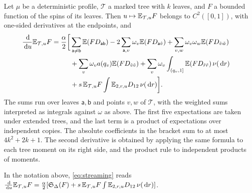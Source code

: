 \begin{lemma}\label{lem:streaming}
Let $\mu$ be a deterministic profile, $\mathcal T$ a marked tree with $k$
leaves, and $F$ a bounded function of the spins of its leaves. Then
$u\mapsto\mathbb E_{\mathcal T,u}F$ belongs to $C^2([0,1])$, with one-sided
derivatives at the endpoints, and
\begin{align}
 \frac{\,\mathrm d}{\,\mathrm d u}\mathbb E_{\mathcal T,u}F=\frac\alpha2\bigg[&
 \sum_{\mathsf a\ne\mathsf b}\mathbb E(FD_{\mathsf{ab}})
 -2\sum_{\mathsf a,v}\omega_v\mathbb E(FD_{\mathsf a\hat v})
 +\sum_{v,w}\omega_v\omega_w\mathbb E(FD_{\hat v\check w})\nonumber\\
 &+\sum_v\omega_va(q_v)\mathbb E(FD_{\hat v\check v})
 +\sum_v\omega_v\int_{(q_v,1]}\mathbb E(FD_{\hat r\check r})\,\nu(\,\mathrm d r)
 \nonumber\\
 &+s\,\mathbb E_{\mathcal T,u}F\int\mathbb E_{2,r,u}D_{12}\,\nu(\,\mathrm d r)\bigg].
 \label{eq:streaming}
\end{align}
The sums run over leaves $\mathsf a,\mathsf b$ and points $v,w$ of
$\mathcal T$, with the weighted sums interpreted as integrals against
$\omega$ as above. The first five expectations are taken under extended
trees, and the last term is a product of expectations over independent
copies. The absolute coefficients in the bracket sum to at most
$4k^2+2k+1$. The second derivative is obtained by applying the same
formula to each tree moment on its right side, and the product rule to
independent products of moments.
\end{lemma}

In the notation above, \eqref{eq:streaming} reads
$\frac{\,\mathrm d}{\,\mathrm d u}\mathbb E_{\mathcal T,u}F=\frac\alpha2[\mathfrak S_\Delta(F)
+s\,\mathbb E_{\mathcal T,u}F\int\mathbb E_{2,r,u}D_{12}\,\nu(\,\mathrm d r)]$.

